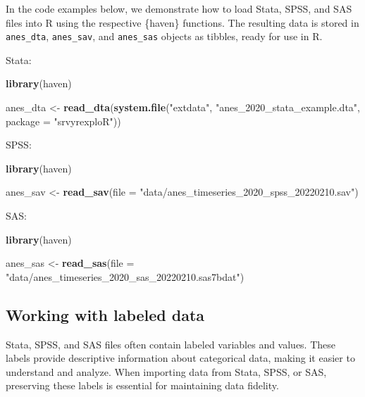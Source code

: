 \documentclass[
]{krantz}
\makeatletter
\newenvironment{Shaded}{\begin{snugshade}}{\end{snugshade}}
\newcommand{\AttributeTok}[1]{\textcolor[rgb]{0.27,0.27,0.27}{#1}}
\newcommand{\FunctionTok}[1]{\textcolor[rgb]{0.27,0.27,0.27}{\textbf{#1}}}
\newcommand{\NormalTok}[1]{#1}
\newcommand{\OtherTok}[1]{\textcolor[rgb]{0.37,0.37,0.37}{#1}}
\newcommand{\StringTok}[1]{\textcolor[rgb]{0.5,0.5,0.5}{#1}}
\newenvironment{kframe}{%
\medskip{}
\setlength{\fboxsep}{.8em}
 \def\at@end@of@kframe{}%
 \ifinner\ifhmode%
  \def\at@end@of@kframe{\end{minipage}}%
  \begin{minipage}{\columnwidth}%
 \fi\fi%
 \def\FrameCommand##1{\hskip\@totalleftmargin \hskip-\fboxsep
 \colorbox{shadecolor}{##1}\hskip-\fboxsep
     \hskip-\linewidth \hskip-\@totalleftmargin \hskip\columnwidth}%
 \MakeFramed {\advance\hsize-\width
   \@totalleftmargin\z@ \linewidth\hsize
   \@setminipage}}%
 {\par\unskip\endMakeFramed%
 \at@end@of@kframe}
\renewenvironment{Shaded}{\begin{kframe}}{\end{kframe}}
\makeatother
\begin{document}
In the code examples below, we demonstrate how to load Stata, SPSS, and SAS files into R using the respective \{haven\} functions. The resulting data is stored in \texttt{anes\_dta}, \texttt{anes\_sav}, and \texttt{anes\_sas} objects as tibbles, ready for use in R.

Stata:

\begin{Shaded}
\begin{Highlighting}[]
\FunctionTok{library}\NormalTok{(haven)}

\NormalTok{anes\_dta }\OtherTok{\textless{}{-}}
  \FunctionTok{read\_dta}\NormalTok{(}\FunctionTok{system.file}\NormalTok{(}\StringTok{"extdata"}\NormalTok{, }\StringTok{"anes\_2020\_stata\_example.dta"}\NormalTok{, }\AttributeTok{package =} \StringTok{"srvyrexploR"}\NormalTok{))}
\end{Highlighting}
\end{Shaded}

SPSS:

\begin{Shaded}
\begin{Highlighting}[]
\FunctionTok{library}\NormalTok{(haven)}

\NormalTok{anes\_sav }\OtherTok{\textless{}{-}}
  \FunctionTok{read\_sav}\NormalTok{(}\AttributeTok{file =} \StringTok{"data/anes\_timeseries\_2020\_spss\_20220210.sav"}\NormalTok{)}
\end{Highlighting}
\end{Shaded}

SAS:

\begin{Shaded}
\begin{Highlighting}[]
\FunctionTok{library}\NormalTok{(haven)}

\NormalTok{anes\_sas }\OtherTok{\textless{}{-}}
  \FunctionTok{read\_sas}\NormalTok{(}\AttributeTok{file =} \StringTok{"data/anes\_timeseries\_2020\_sas\_20220210.sas7bdat"}\NormalTok{)}
\end{Highlighting}
\end{Shaded}

\hypertarget{working-with-labeled-data}{%
\subsection{Working with labeled data}\label{working-with-labeled-data}}

Stata, SPSS, and SAS files often contain labeled variables and values. These labels provide descriptive information about categorical data, making it easier to understand and analyze. When importing data from Stata, SPSS, or SAS, preserving these labels is essential for maintaining data fidelity.
\end{document}
